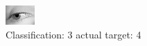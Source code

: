 \begin{figure}[h!]
\begin{center}
\includegraphics[width=0.60\columnwidth]{figures/ID2992_class_3_target_4.png}
\end{center}
\caption{ Classification: 3 actual target: 4}
\label{fig:ID2992_class_3_target_4}
\end{figure}
